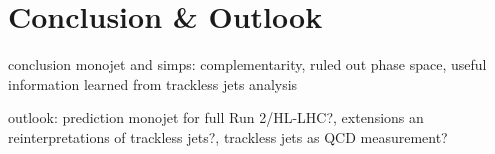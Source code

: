 \graphicspath{{chapt_dutch/}{intro/}{conclusions/}}

\renewcommand\evenpagerightmark{{\scshape\small Conclusion}}
\renewcommand\oddpageleftmark{{\scshape\small Conclusion}}

\hyphenation{}

\chapter{Conclusion \& Outlook}

conclusion monojet and simps: complementarity, ruled out phase space, useful information learned from trackless jets analysis

outlook: prediction monojet for full Run 2/HL-LHC?, extensions an reinterpretations of trackless jets?, trackless jets as QCD measurement?


\clearpage{\pagestyle{empty}\cleardoublepage}
